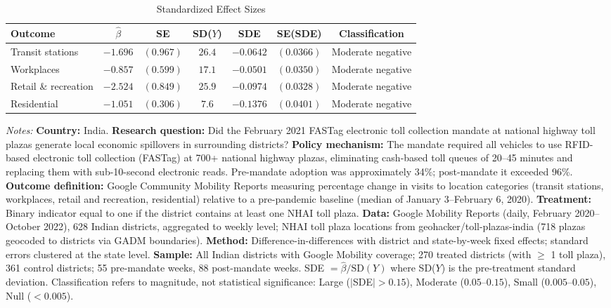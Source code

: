 \begin{table}[t]
\centering
\caption{Standardized Effect Sizes}
\label{tab:sde}
\small
\begin{tabular}{lcccccc}
\toprule
Outcome & $\hat{\beta}$ & SE & SD($Y$) & SDE & SE(SDE) & Classification \\
\midrule
Transit stations & $-1.696$ & $(0.967)$ & $26.4$ & $-0.0642$ & $(0.0366)$ & Moderate negative \\
Workplaces & $-0.857$ & $(0.599)$ & $17.1$ & $-0.0501$ & $(0.0350)$ & Moderate negative \\
Retail \& recreation & $-2.524$ & $(0.849)$ & $25.9$ & $-0.0974$ & $(0.0328)$ & Moderate negative \\
Residential & $-1.051$ & $(0.306)$ & $7.6$ & $-0.1376$ & $(0.0401)$ & Moderate negative \\
\bottomrule
\end{tabular}
\begin{tablenotes}
\item \textit{Notes:} \textbf{Country:} India. \textbf{Research question:} Did the February 2021 FASTag electronic toll collection mandate at national highway toll plazas generate local economic spillovers in surrounding districts? \textbf{Policy mechanism:} The mandate required all vehicles to use RFID-based electronic toll collection (FASTag) at 700+ national highway plazas, eliminating cash-based toll queues of 20--45 minutes and replacing them with sub-10-second electronic reads. Pre-mandate adoption was approximately 34\%; post-mandate it exceeded 96\%. \textbf{Outcome definition:} Google Community Mobility Reports measuring percentage change in visits to location categories (transit stations, workplaces, retail and recreation, residential) relative to a pre-pandemic baseline (median of January 3--February 6, 2020). \textbf{Treatment:} Binary indicator equal to one if the district contains at least one NHAI toll plaza. \textbf{Data:} Google Mobility Reports (daily, February 2020--October 2022), 628 Indian districts, aggregated to weekly level; NHAI toll plaza locations from geohacker/toll-plazas-india (718 plazas geocoded to districts via GADM boundaries). \textbf{Method:} Difference-in-differences with district and state-by-week fixed effects; standard errors clustered at the state level. \textbf{Sample:} All Indian districts with Google Mobility coverage; 270 treated districts (with $\geq$ 1 toll plaza), 361 control districts; 55 pre-mandate weeks, 88 post-mandate weeks. SDE $= \hat{\beta} / \text{SD}(Y)$ where SD($Y$) is the pre-treatment standard deviation. Classification refers to magnitude, not statistical significance: Large ($|$SDE$| > 0.15$), Moderate ($0.05$--$0.15$), Small ($0.005$--$0.05$), Null ($< 0.005$).
\end{tablenotes}
\end{table}

